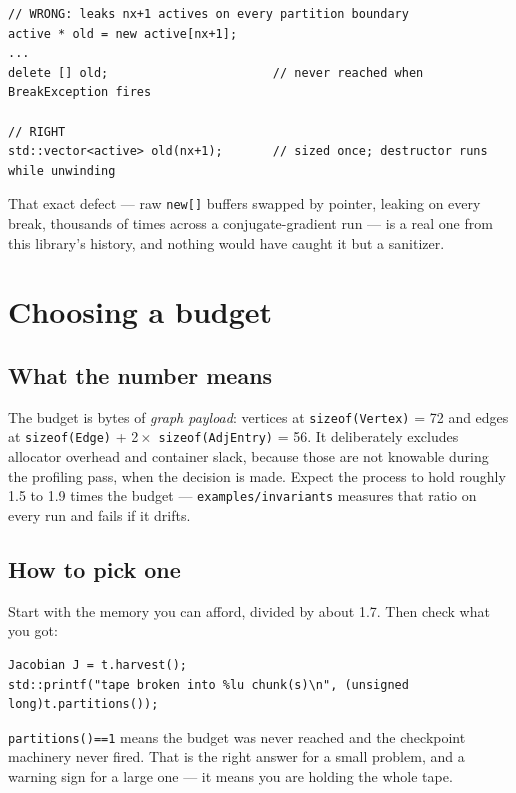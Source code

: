 \documentclass[11pt,a4paper]{report}
\newcommand{\code}[1]{\texttt{#1}}
\begin{document}
\begin{lstlisting}
// WRONG: leaks nx+1 actives on every partition boundary
active * old = new active[nx+1];
...
delete [] old;                       // never reached when BreakException fires

// RIGHT
std::vector<active> old(nx+1);       // sized once; destructor runs while unwinding
\end{lstlisting}

\noindent
That exact defect --- raw \code{new[]} buffers swapped by pointer, leaking on
every break, thousands of times across a conjugate-gradient run --- is a real one
from this library's history, and nothing would have caught it but a sanitizer.

\chapter{Choosing a budget}
\label{sec:budget}

\section{What the number means}

The budget is bytes of \emph{graph payload}: vertices at
\code{sizeof(Vertex)} = 72 and edges at \code{sizeof(Edge)} + 2\,$\times$\,
\code{sizeof(AdjEntry)} = 56. It deliberately excludes allocator overhead and
container slack, because those are not knowable during the profiling pass, when
the decision is made. Expect the process to hold roughly 1.5 to 1.9 times the
budget --- \code{examples/invariants} measures that ratio on every run and fails
if it drifts.

\section{How to pick one}

Start with the memory you can afford, divided by about 1.7. Then check what you
got:

\begin{lstlisting}
Jacobian J = t.harvest();
std::printf("tape broken into %lu chunk(s)\n", (unsigned long)t.partitions());
\end{lstlisting}

\code{partitions()==1} means the budget was never reached and the checkpoint
machinery never fired. That is the right answer for a small problem, and a
warning sign for a large one --- it means you are holding the whole tape.
\end{document}
